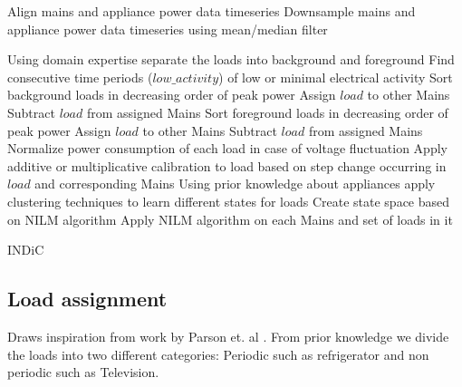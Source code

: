 \documentclass[conference]{IEEEtran}
\begin{document}
\begin{algorithm}
\DontPrintSemicolon %
Align mains and appliance power data timeseries\;
Downsample mains and appliance power data timeseries using mean/median filter\;

Using domain expertise separate the loads into background and foreground\;
Find consecutive time periods ($low\_activity$) of low or minimal electrical activity\;
Sort background loads in decreasing order of peak power \;
	{
	 {
	Assign $load$ to other Mains\;	
	}
	Subtract $load$ from assigned Mains
	}
Sort foreground loads in decreasing order of peak power\;
	{
	 {
	Assign $load$ to other Mains\;	
	}
	Subtract $load$ from assigned Mains
	}
{
Normalize power consumption of each load in case of voltage fluctuation\;
Apply additive or multiplicative calibration to load based on step change occurring in $load$ and corresponding Mains\;
Using prior knowledge about appliances apply clustering techniques to learn different states for loads\;
}
Create state space based on NILM algorithm\;
Apply NILM algorithm on each Mains and set of loads in it

\;
\caption{INDiC}
\label{algo:main}
\end{algorithm}
\subsection{Load assignment}
Draws inspiration from work by Parson et. al \cite{parson2012_aaai}. From prior knowledge we divide the loads into two different categories: Periodic such as refrigerator and non periodic such as Television.
\end{document}
